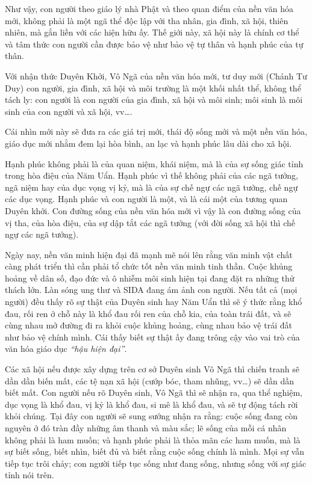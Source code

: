 Như vậy, con người theo giáo lý nhà Phật và theo quan điểm của nền văn hóa mới, không phải là một ngã thể độc lập với tha nhân, gia đình, xã hội, thiên nhiên, mà gắn liền với các hiện hữu ấy. Thế giới này, xã hội này là chính cơ thể và tâm thức con người cần được bảo vệ như bảo vệ tự thân và hạnh phúc của tự thân.

Với nhận thức Duyên Khởi, Vô Ngã của nền văn hóa mới, tư duy mới (Chánh Tư Duy) con người, gia đình, xã hội và môi trường là một khối nhất thể, không thể tách ly: con người là con người của gia đình, xã hội và môi sinh; môi sinh là môi sinh của con người và xã hội, vv\ldots.

Cái nhìn mới này sẽ đưa ra các giá trị mới, thái độ sống mới và một nền văn hóa, giáo dục mới nhằm đem lại hòa bình, an lạc và hạnh phúc lâu dài cho xã hội.

Hạnh phúc không phải là của quan niệm, khái niệm, mà là của sự sống giác tỉnh trong hòa điệu của Năm Uẩn. Hạnh phúc vì thế không phải của các ngã tưởng, ngã niệm hay của dục vọng vị kỷ, mà là của sự chế ngự các ngã tưởng, chế ngự các dục vọng. Hạnh phúc và con người là một, và là cái một của tương quan Duyên khởi. Con đường sống của nền văn hóa mới vì vậy là con đường sống của vị tha, của hòa điệu, của sự dập tắt các ngã tưởng (với đời sống xã hội thì chế ngự các ngã tưởng).

Ngày nay, nền văn minh hiện đại đã mạnh mẽ nói lên rằng văn minh vật chất càng phát triển thì cần phải tổ chức tốt nền văn minh tinh thần. Cuộc khủng hoảng về dân số, đạo đức và ô nhiễm môi sinh hiện tại đang đặt ra những thử thách lớn. Làn sóng ung thư và SIDA đang ám ảnh con người. Nếu tất cả (mọi người) đều thấy rõ sự thật của Duyên sinh hay Năm Uẩn thì sẽ ý thức rằng khổ đau, rối ren ở chỗ này là khổ đau rối ren của chỗ kia, của toàn trái đất, và sẽ cùng nhau mở đường đi ra khỏi cuộc khủng hoảng, cùng nhau bảo vệ trái đất như bảo vệ chính mình. Cái thấy biết sự thật ấy đang trông cậy vào vai trò của văn hóa giáo dục \emph{``hậu hiện đại''}.

Các xã hội nếu được xây dựng trên cơ sở Duyên sinh Vô Ngã thì chiến tranh sẽ dần dần biến mất, các tệ nạn xã hội (cướp bóc, tham nhũng, vv\ldots) sẽ dần dần biết mất. Con người nếu rõ Duyên sinh, Vô Ngã thì sẽ nhận ra, qua thể nghiệm, dục vọng là khổ đau, vị kỷ là khổ đau, si mê là khổ đau, và sẽ tự động tách rời khỏi chúng. Tại đây con người sẽ sung sướng nhận ra rằng: cuộc sống đang còn nguyên ở đó tràn đầy những âm thanh và màu sắc; lẽ sống của mỗi cá nhân không phải là ham muốn; và hạnh phúc phải là thỏa mãn các ham muốn, mà là sự biết sống, biết nhìn, biết đủ và biết rằng cuộc sống chính là mình. Mọi sự vẫn tiếp tục trôi chảy; con người tiếp tục sống như đang sống, nhưng sống với sự giác tỉnh nói trên.

